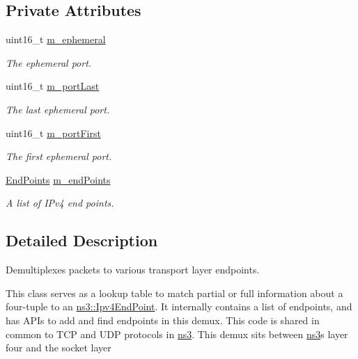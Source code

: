 \subsection*{Private Attributes}
\begin{DoxyCompactItemize}
\item 
uint16\+\_\+t \hyperlink{classns3_1_1Ipv4EndPointDemux_ab06ea605c5e81b34971468d1244a7c45}{m\+\_\+ephemeral}
\begin{DoxyCompactList}\small\item\em The ephemeral port. \end{DoxyCompactList}\item 
uint16\+\_\+t \hyperlink{classns3_1_1Ipv4EndPointDemux_a3f18b7e91d6413f04a591b1e2ca7b02f}{m\+\_\+port\+Last}
\begin{DoxyCompactList}\small\item\em The last ephemeral port. \end{DoxyCompactList}\item 
uint16\+\_\+t \hyperlink{classns3_1_1Ipv4EndPointDemux_a0407d0c9cc04dd29a887eabeb3fc1c89}{m\+\_\+port\+First}
\begin{DoxyCompactList}\small\item\em The first ephemeral port. \end{DoxyCompactList}\item 
\hyperlink{classns3_1_1Ipv4EndPointDemux_a506a9661c08e2a64dab09ad6613d3b45}{End\+Points} \hyperlink{classns3_1_1Ipv4EndPointDemux_a3a0f7107698fe56cf60b2a0647682cdf}{m\+\_\+end\+Points}
\begin{DoxyCompactList}\small\item\em A list of I\+Pv4 end points. \end{DoxyCompactList}\end{DoxyCompactItemize}


\subsection{Detailed Description}
Demultiplexes packets to various transport layer endpoints. 

This class serves as a lookup table to match partial or full information about a four-\/tuple to an \hyperlink{classns3_1_1Ipv4EndPoint}{ns3\+::\+Ipv4\+End\+Point}. It internally contains a list of endpoints, and has A\+P\+Is to add and find endpoints in this demux. This code is shared in common to T\+CP and U\+DP protocols in \hyperlink{namespacens3}{ns3}. This demux sits between \hyperlink{namespacens3}{ns3}\textquotesingle{}s layer four and the socket layer 

